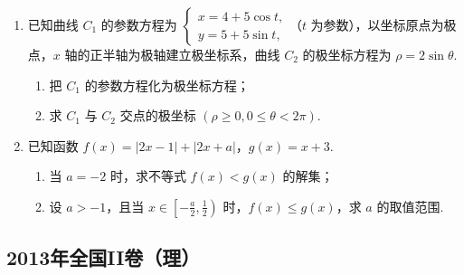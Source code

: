 \begin{description}
\begin{enumerate}[leftmargin=5pt]
        \item 已知曲线 \(C_1\) 的参数方程为 \(\begin{cases}
x = 4 + 5\cos t,\\
y = 5 + 5\sin t,
\end{cases}\)（\(t\) 为参数），以坐标原点为极点，\(x\) 轴的正半轴为极轴建立极坐标系，曲线 \(C_2\) 的极坐标方程为 \(\rho = 2\sin\theta\).
\begin{enumerate}
\item 把 \(C_1\) 的参数方程化为极坐标方程；
\item 求 \(C_{1}\) 与 \(C_{2}\) 交点的极坐标 \(\left(\rho \geqslant 0, 0 \leqslant \theta < 2\pi\right)\).
\end{enumerate}

        \item 已知函数 \( f(x) = |2x - 1| + |2x + a| \)，\( g(x) = x + 3 \).
\begin{enumerate}
\item 当 \(a = -2\) 时，求不等式 \(f(x) < g(x)\) 的解集；
\item 设 \(a > -1\)，且当 \(x \in \left[-\frac{a}{2}, \frac{1}{2}\right)\) 时，\(f(x) \leqslant g(x)\)，求 \(a\) 的取值范围.
\end{enumerate}

    \end{enumerate}

\end{description}


\subsection{2013年全国II卷（理）}\label{gk:2013年全国II卷（理）}

